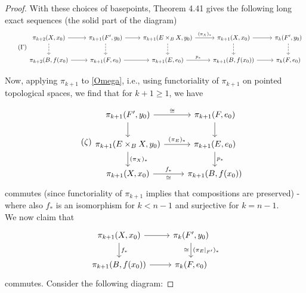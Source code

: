 \documentclass[reqno]{amsart}
\theoremstyle{definition}
\theoremstyle{remark}
\begin{document}
\begin{proof}
        With these choices of basepoints,
        Theorem 4.41 gives the following long exact sequences
        (the solid part of the diagram)
        \begin{equation*}\tag{$\Gamma$}\label{Gamma}
        \begin{tikzcd}
            \pi_{k+2}(X,x_0) \ar[d, dashed]
            \ar[r] & \pi_{k+1}(F',y_0) \ar[r] \ar[d, dashed] & 
            \pi_{k+1}(E \times_B X, y_0) \ar[r, "(\pi_X)_*"] 
            \ar[d, dashed] &
            \pi_{k+1}(X,x_0) \ar[r] \ar[d, dashed] & 
            \pi_k (F',y_0) \ar[d, dashed] \\
            \pi_{k+2}(B, f(x_0) \ar[r] & \pi_{k+1}(F, e_0) \ar[r] & 
            \pi_{k+1}(E,e_0) \ar[r, "p_*"] &
            \pi_{k+1}(B,f(x_0)) \ar[r] &
            \pi_{k}(F,e_0)
        \end{tikzcd}
        \end{equation*}

        Now, applying $\pi_{k+1}$ to 
        \eqref{Omega}, i.e., using functoriality of
        $\pi_{k+1}$ on pointed topological spaces,
        we find that for
        $k+1 \ge 1$, we have

        
        \begin{equation*}\tag{$\zeta$}\label{zeta}
        \begin{tikzcd}
            \pi_{k+1}(F', y_0) \ar[r, "\cong"] \ar[d]
            & \pi_{k+1}(F,e_0) \ar[d] \\
            \pi_{k+1}(E \times_B X, y_0)
            \ar[d, "(\pi_X)_*"] \ar[r, "(\pi_E)_*"]
            & \pi_{k+1}(E,e_0) \ar[d, "p_*"] \\
            \pi_{k+1}(X,x_0) \ar[r, "f_*", "\cong"']
            & \pi_{k+1}(B,f(x_0))
        \end{tikzcd}
        \end{equation*}
        commutes (since functoriality of $\pi_{k+1}$ implies
        that compositions are preserved) - where
        also $f_*$ is an isomorphism for
        $k < n-1$ and surjective for
        $k = n-1$.\\
        We now claim that
        \begin{equation*}
        \begin{tikzcd}
            \pi_{k+1}(X,x_0) \ar[r] \ar[d, "f_*"] &
            \pi_k (F',y_0) \ar[d, "(\pi_E|_{F'})_*",
            "\cong"']\\
            \pi_{k+1}(B,f(x_0)) \ar[r] & 
            \pi_{k}(F,e_0)
        \end{tikzcd}
        \end{equation*}
        commutes.
        Consider the following diagram:


\end{proof}
\end{document}
